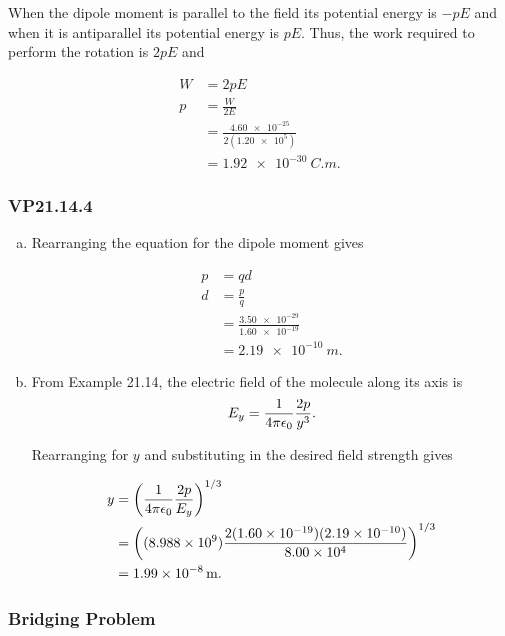 \documentclass{article}
\begin{document}
When the dipole moment is parallel to the field its potential energy is $-p E$ and when it is antiparallel its potential energy is $p E$. Thus, the work required to perform the rotation is $2 p E$ and

\begin{align*}
  W & = 2 p E                                   \\
  p & = \frac{W}{2 E}                           \\
    & = \frac{\num{4.60e-25}}{2 (\num{1.20e5})} \\
    & = \qty{1.92e-30}{C.m}.
\end{align*}

\subsubsection{VP21.14.4}

\newcommand{\kev}{\num{8.988e9}}

\begin{enumerate}[a)]
  \item Rearranging the equation for the dipole moment gives

        \begin{align*}
          p & = q d                                   \\
          d & = \frac{p}{q}                           \\
            & = \frac{\num{3.50e-29}}{\num{1.60e-19}} \\
            & = \qty{2.19e-10}{m}.
        \end{align*}

  \item From Example 21.14, the electric field of the molecule along its axis is \[E_y = \frac{1}{4 \pi \epsilon_0} \frac{2p}{y^3}.\]

        Rearranging for $y$ and substituting in the desired field strength gives

        \begin{align*}
          y & = \left( \ke \frac{2 p}{E_y} \right)^{1/3}                                             \\
            & = \left( (\kev) \frac{2 (\num{1.60e-19}) (\num{2.19e-10})}{\num{8.00e4}} \right)^{1/3} \\
            & = \qty{1.99e-8}{m}.
        \end{align*}
\end{enumerate}

\subsubsection{Bridging Problem}
\end{document}
